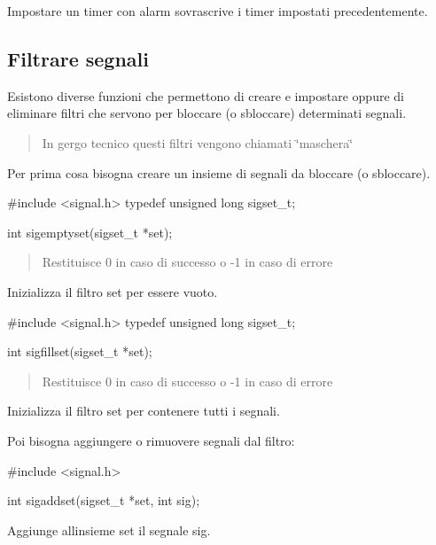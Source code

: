 Impostare un timer con {\ttfamily alarm} sovrascrive i timer impostati precedentemente.

\subsection*{Filtrare segnali}

Esistono diverse funzioni che permettono di creare e impostare oppure di eliminare filtri che servono per bloccare (o sbloccare) determinati segnali. \begin{quote}
In gergo tecnico questi filtri vengono chiamati \char`\"{}maschera\char`\"{} \end{quote}


Per prima cosa bisogna creare un insieme di segnali da bloccare (o sbloccare). 
\begin{DoxyCode}
\textcolor{preprocessor}{#include <signal.h>}
\textcolor{keyword}{typedef} \textcolor{keywordtype}{unsigned} \textcolor{keywordtype}{long} sigset\_t;

\textcolor{keywordtype}{int} sigemptyset(sigset\_t *\textcolor{keyword}{set});
\end{DoxyCode}
 \begin{quote}
Restituisce 0 in caso di successo o -\/1 in caso di errore \end{quote}
Inizializza il filtro {\ttfamily set} per essere vuoto.


\begin{DoxyCode}
\textcolor{preprocessor}{#include <signal.h>}
\textcolor{keyword}{typedef} \textcolor{keywordtype}{unsigned} \textcolor{keywordtype}{long} sigset\_t;

\textcolor{keywordtype}{int} sigfillset(sigset\_t *\textcolor{keyword}{set});
\end{DoxyCode}
 \begin{quote}
Restituisce 0 in caso di successo o -\/1 in caso di errore \end{quote}
Inizializza il filtro {\ttfamily set} per contenere tutti i segnali.

Poi bisogna aggiungere o rimuovere segnali dal filtro\+: 
\begin{DoxyCode}
\textcolor{preprocessor}{#include <signal.h>}

\textcolor{keywordtype}{int} sigaddset(sigset\_t *\textcolor{keyword}{set}, \textcolor{keywordtype}{int} sig);
\end{DoxyCode}
 Aggiunge all\textquotesingle{}insieme {\ttfamily set} il segnale {\ttfamily sig}.


